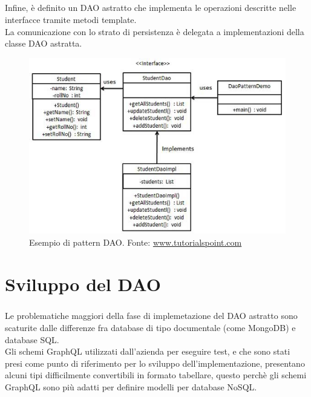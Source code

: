 \documentclass[a4paper, 12pt]{report}
\begin{document}
    \paragraph*{}
    Infine, è definito un DAO astratto che implementa le operazioni descritte nelle interfacce tramite metodi template.\\
    La comunicazione con lo strato di persistenza è delegata a implementazioni della classe DAO astratta.
    \begin{figure}[H]
      \includegraphics[width=\textwidth]{dao_pattern_uml_diagram.jpg}
      \caption{Esempio di pattern DAO. Fonte: \href{https://www.tutorialspoint.com/design_pattern/images/dao_pattern_uml_diagram.jpg}{www.tutorialspoint.com}}
    \end{figure}
  \newpage
  \chapter{Sviluppo del DAO}
    \paragraph*{}
    Le problematiche maggiori della fase di implemetazione del DAO astratto sono scaturite dalle differenze fra database di tipo documentale (come MongoDB) e database SQL.\\
    Gli schemi GraphQL utilizzati dall'azienda per eseguire test, e che sono stati presi come punto di riferimento per lo sviluppo dell'implementazione, presentano alcuni tipi difficilmente convertibili in formato tabellare, questo perchè gli schemi GraphQL sono
    più adatti per definire modelli per database NoSQL.
\end{document}
